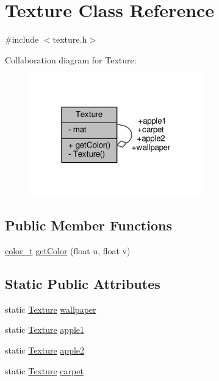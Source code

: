 \hypertarget{classTexture}{}\section{Texture Class Reference}
\label{classTexture}


{\ttfamily \#include $<$texture.\+h$>$}



Collaboration diagram for Texture\+:
\nopagebreak
\begin{figure}[H]
\begin{center}
\leavevmode
\includegraphics[width=214pt]{classTexture__coll__graph}
\end{center}
\end{figure}
\subsection*{Public Member Functions}
\begin{DoxyCompactItemize}
\item 
\hyperlink{ray_8h_a8a2580fb65f7d3d4e24bdd412b9bd92d}{color\+\_\+t} \hyperlink{classTexture_a78e72a36da8f70603b2753b302c97330}{get\+Color} (float u, float v)
\end{DoxyCompactItemize}
\subsection*{Static Public Attributes}
\begin{DoxyCompactItemize}
\item 
static \hyperlink{classTexture}{Texture} \hyperlink{classTexture_a1fe6c8c86fe00b7f58d874c136b632ba}{wallpaper}
\item 
static \hyperlink{classTexture}{Texture} \hyperlink{classTexture_a8e1a3440b73df4de4cdc72e888ce3583}{apple1}
\item 
static \hyperlink{classTexture}{Texture} \hyperlink{classTexture_a7671792b2d9981a786ec01069a8d5f35}{apple2}
\item 
static \hyperlink{classTexture}{Texture} \hyperlink{classTexture_ade074c4142073f53a973ec8223395f67}{carpet}
\end{DoxyCompactItemize}
